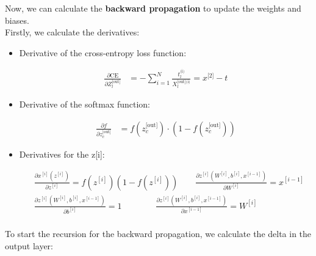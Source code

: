 \documentclass[12pt]{article}
\begin{document}
\begin{enumerate}
Now, we can calculate the \textbf{backward propagation} to update the weights and biases.\\
Firstly, we calculate the derivatives:

\begin{itemize}
    \item Derivative of the cross-entropy loss function:
    
    \begin{equation*}
        \begin{aligned}
            \frac{\partial \text{CE}}{\partial Z_{l}^{\text{[out]}}} &= -\sum_{i=1}^{N} \frac{t_{l}^{\text{(i)}}}{X_{l}^{\text{[out](i)}}} = x^{\text{[2]}} - t
        \end{aligned}
    \end{equation*}

    \item Derivative of the softmax function:
    
    \begin{equation*}
        \begin{aligned}
            \frac{\partial f}{\partial z_c^\text{[out]}} &= f(z_c^\text{[out]}) \cdot (1 - f(z_c^\text{[out]}))
        \end{aligned}
    \end{equation*}

    \item Derivatives for the z[i]:
    
    \begin{equation*}
        \begin{aligned}
            &\frac{\partial x^{[i]}(z^{[i]})}{\partial z^{[i]}} = f(z^{[i]})(1 - f(z^{[i]})) \qquad \frac{\partial z^{[i]}(W^{[i]}, b^{[i]}, x^{[i-1]})}{\partial W^{[i]}} = x^{[i-1]}\\
            &\frac{\partial z^{[i]}(W^{[i]}, b^{[i]}, x^{[i-1]})}{\partial b^{[i]}} = 1 \qquad \quad \quad \frac{\partial z^{[i]}(W^{[i]}, b^{[i]}, x^{[i-1]})}{\partial x^{[i-1]}} = W^{[i]}\\
        \end{aligned}
    \end{equation*}

\end{itemize}

\vspace{10pt}
To start the recursion for the backward propagation, we calculate the delta in the output layer:


\end{enumerate}
\end{document}
